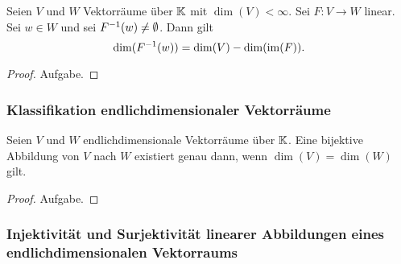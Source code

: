 \begin{klr}
	Seien $ V $ und $ W $ Vektorräume über $ \mathbb K $ mit $ \dim(V) < \infty $. Sei $ F : V \to W $ linear. Sei $ w \in W $ und sei $ F^{-1}(w) \neq \empty \emptyset $. Dann gilt
	\begin{equation}
		\dim(F^{-1}(w)) = \dim(V) - \dim(\operatorname{im}(F)).
	\end{equation}
\end{klr}
\begin{proof}
	Aufgabe.
\end{proof}

\subsubsection{Klassifikation endlichdimensionaler Vektorräume}

\begin{klr}
	Seien $ V $ und $ W $ endlichdimensionale Vektorräume über $ \mathbb K $. Eine bijektive Abbildung von $ V $ nach $ W $ existiert genau dann, wenn $ \dim(V) = \dim(W) $ gilt.
\end{klr}
\begin{proof}
	Aufgabe.
\end{proof}

\subsubsection{Injektivität und Surjektivität linearer Abbildungen eines endlichdimensionalen Vektorraums}

